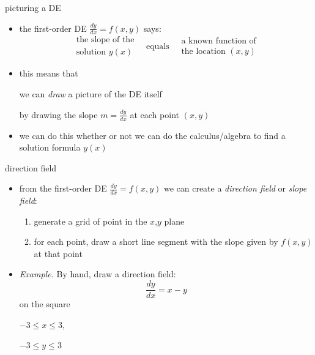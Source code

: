\documentclass[colorlinks]{beamer}
\newcommand{\ds}{\displaystyle}
\begin{document}
\begin{frame}{picturing a DE}

\begin{itemize}
\item the first-order DE \quad $\ds \frac{dy}{dx} = f(x,y)$ \quad says:
    $$\boxed{\begin{matrix}
    \text{the slope of the} \\
    \text{solution } y(x) 
    \end{matrix} \quad \text{equals} \quad
    \begin{matrix}
    \text{a known function of} \\
    \text{the location } (x,y)
    \end{matrix}}$$

\item this means that

\centerline{\alert{we can \emph{draw} a picture of the DE itself}}

by drawing the slope $m=\frac{dy}{dx}$ at each point $(x,y)$

\item we can do this whether or not we can do the calculus/algebra to find a solution formula $y(x)$
\end{itemize}
\end{frame}


\begin{frame}{direction field}

\begin{itemize}
\item from the first-order DE $\ds \frac{dy}{dx} = f(x,y)$ we can create a \emph{direction field} or \emph{slope field}:
    \begin{enumerate}
    \item generate a grid of point in the $x$,$y$ plane
    \item for each point, draw a short line segment with the slope given by $f(x,y)$ at that point
    \end{enumerate}

\bigskip
\item \begin{minipage}[t]{0.32\textwidth}
\emph{Example.}  By hand, draw a direction field:
$$\frac{dy}{dx} = x-y$$
on the square

$-3 \le x \le 3$,

$-3 \le y \le 3$
\end{minipage} 

\vspace{20mm}
\end{itemize}
\end{frame}
\end{document}
